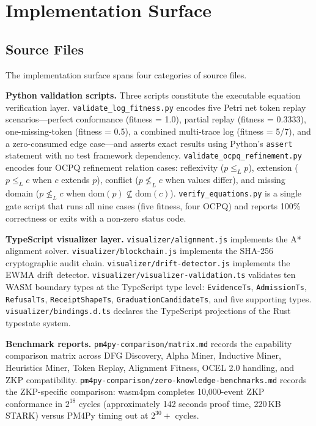 
\section{Implementation Surface}
\label{sec:experiments-core-impl}

\subsection{Source Files}
\label{sec:experiments-core-impl-sources}

The implementation surface spans four categories of source files.

\textbf{Python validation scripts.} Three scripts constitute the executable equation
verification layer. \texttt{validate\_log\_fitness.py} encodes five Petri net token
replay scenarios---perfect conformance (fitness = 1.0), partial replay (fitness
= 0.3333), one-missing-token (fitness = 0.5), a combined multi-trace log (fitness
= 5/7), and a zero-consumed edge case---and asserts exact results using Python's
\texttt{assert} statement with no test framework dependency.
\texttt{validate\_ocpq\_refinement.py} encodes four OCPQ refinement relation cases:
reflexivity ($p \leq_L p$), extension ($p \leq_L c$ when $c$ extends $p$),
conflict ($p \not\leq_L c$ when values differ), and missing domain
($p \not\leq_L c$ when $\mathrm{dom}(p) \not\subseteq \mathrm{dom}(c)$).
\texttt{verify\_equations.py} is a single gate script that runs all nine cases
(five fitness, four OCPQ) and reports 100\% correctness or exits with a non-zero
status code.

\textbf{TypeScript visualizer layer.} \texttt{visualizer/alignment.js} implements
the A* alignment solver. \texttt{visualizer/blockchain.js} implements the SHA-256
cryptographic audit chain. \texttt{visualizer/drift-detector.js} implements the
EWMA drift detector. \texttt{visualizer/visualizer-validation.ts} validates ten WASM
boundary types at the TypeScript type level: \texttt{EvidenceTs}, \texttt{AdmissionTs},
\texttt{RefusalTs}, \texttt{ReceiptShapeTs}, \texttt{GraduationCandidateTs}, and
five supporting types. \texttt{visualizer/bindings.d.ts} declares the TypeScript
projections of the Rust typestate system.

\textbf{Benchmark reports.} \texttt{pm4py-comparison/matrix.md} records the
capability comparison matrix across DFG Discovery, Alpha Miner, Inductive Miner,
Heuristics Miner, Token Replay, Alignment Fitness, OCEL 2.0 handling, and ZKP
compatibility. \texttt{pm4py-comparison/zero-knowledge-benchmarks.md} records the
ZKP-specific comparison: wasm4pm completes 10,000-event ZKP conformance in $2^{18}$
cycles (approximately 142 seconds proof time, 220\,KB STARK) versus PM4Py timing
out at $2^{30}+$ cycles.


